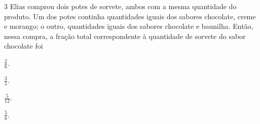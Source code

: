 

\num{3}  Elias comprou dois potes de sorvete, ambos com a mesma quantidade do
produto. Um dos potes continha quantidades iguais dos sabores chocolate,
creme e morango; o outro, quantidades iguais dos sabores chocolate e
baunilha. Então, nessa compra, a fração total
correspondente à quantidade de sorvete do sabor chocolate foi

\begin{escolha}
\item $\frac{2}{6}$. 
\item $\frac{3}{5}$. 
\item $\frac{5}{12}$. 
\item $\frac{5}{6}$.
\end{escolha}




